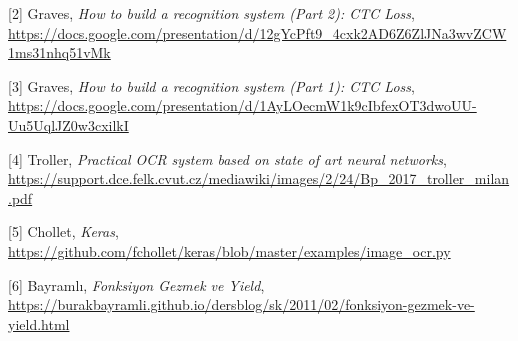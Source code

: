 \documentclass[12pt,fleqn]{article}\usepackage{../../common}
\begin{document}
[2] Graves, {\em How to build a recognition system (Part 2): CTC Loss}, 
    \url{https://docs.google.com/presentation/d/12gYcPft9_4cxk2AD6Z6ZlJNa3wvZCW1ms31nhq51vMk}

[3] Graves, {\em How to build a recognition system (Part 1): CTC Loss}, 
    \url{https://docs.google.com/presentation/d/1AyLOecmW1k9cIbfexOT3dwoUU-Uu5UqlJZ0w3cxilkI}

[4] Troller, {\em Practical OCR system based on state of art neural networks}, 
    \url{https://support.dce.felk.cvut.cz/mediawiki/images/2/24/Bp_2017_troller_milan.pdf}

[5] Chollet, {\em Keras}, 
    \url{https://github.com/fchollet/keras/blob/master/examples/image_ocr.py}

[6] Bayramlı, {\em Fonksiyon Gezmek ve Yield}, 
    \url{https://burakbayramli.github.io/dersblog/sk/2011/02/fonksiyon-gezmek-ve-yield.html}


    
\end{document}

